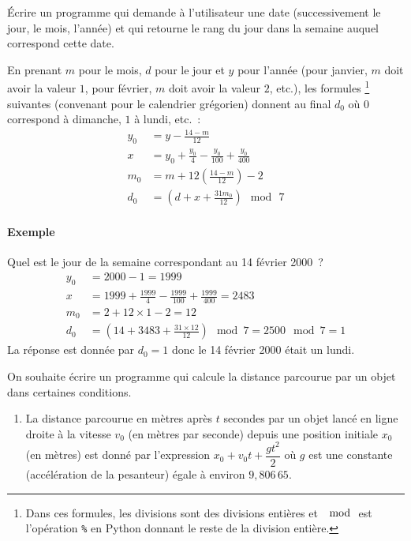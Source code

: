 { \begin{exercice}
 Écrire un programme qui demande à l'utilisateur une date (successivement le jour, le mois, l'année)
 et qui retourne le rang du jour dans la semaine auquel correspond cette date.

En prenant $m$ pour le mois, $d$ pour le jour et $y$ pour l'année (pour janvier, $m$ doit avoir la
valeur $1$, pour février, $m$ doit avoir la valeur $2$, etc.), les formules
\footnote{Dans ces formules, les divisions sont des divisions entières et $\mod$ est l'opération
 \texttt{\%} en Python donnant le reste de la division entière.} suivantes (convenant
pour le calendrier grégorien) donnent au final $d_0$ où $0$ correspond à dimanche,
 $1$ à lundi, etc.~:
\begin{align*}
y_0&=y-\frac{14-m}{12}\\
x&=y_0+\frac{y_0}4-\frac{y_0}{100}+\frac{y_0}{400}\\
m_0&=m+12\left(\frac{14-m}{12}\right)-2\\
d_0&=\left(d+x+\frac{31m_0}{12}\right)\mod\,7
\end{align*}

\paragraph{Exemple}
Quel est le jour de la semaine correspondant au 14 février 2000~?
\begin{align*}
y_0&=2000-1=1999\\
x&=1999+\frac{1999}4-\frac{1999}{100}+\frac{1999}{400}=2483\\
m_0&=2+12\times1-2=12\\
d_0&=\left(14+3483+\frac{31\times12}{12}\right)\mod7=2500\mod7=1
\end{align*}
La réponse est donnée par $d_0=1$ donc le 14 février 2000 était un lundi.
 \end{exercice}
\newpage{}
 \begin{exercice} On souhaite écrire un programme qui calcule
 la distance parcourue par un objet dans certaines conditions.
 \begin{enumerate}
 	\item La distance parcourue en mètres après $t$ secondes par un objet lancé en ligne droite à la vitesse
 $v_0$ (en mètres par seconde) depuis une position initiale $x_0$ (en mètres) est donné par
 l'expression $x_0+v_0t+\dfrac{gt^2}2$ où $g$ est une constante (accélération de la pesanteur)
 égale à environ $ 9,806\,65$.


\end{enumerate}
\end{exercice}}
